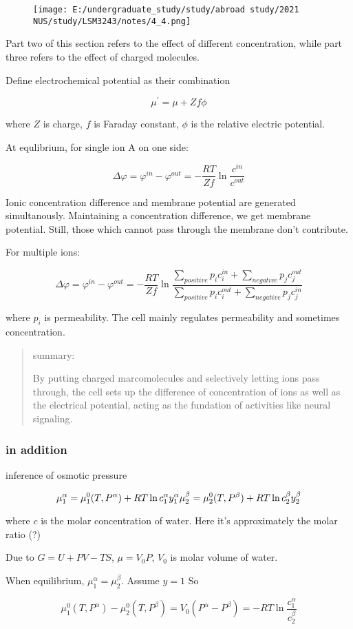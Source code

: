 \begin{figure}
	\centering
	\texttt{[image: E:/undergraduate\_study/study/abroad study/2021 NUS/study/LSM3243/notes/4\_4.png]}
	\caption{}
\end{figure}

Part two of this section refers to the effect of different
concentration, while part three refers to the effect of charged
molecules.

Define electrochemical potential as their combination

\[\mu^\prime=\mu+Zf\phi\]

where \(Z\) is charge, \(f\) is Faraday constant, \(\phi\) is the
relative electric potential.

At equlibrium, for single ion A on one side:

\[\Delta\varphi=\varphi^{in}-\varphi^{out}=-\dfrac{RT}{Zf}\ln\dfrac{c^{in}}{c^{out}}\]

Ionic concentration difference and membrane potential are generated
simultanously. Maintaining a concentration difference, we get membrane
potential. Still, those which cannot pass through the membrane don't
contribute.

For multiple ions:

\[\Delta\varphi=\varphi^{in}-\varphi^{out}=-\dfrac{RT}{Zf}\ln\dfrac{\sum\limits_{positive} p_ic_{i}^{in}+\sum\limits_{negative} p_jc_{j}^{out}}{\sum\limits_{positive} p_ic_{i}^{out}+\sum\limits_{negative} p_jc_{j}^{in}}\]

where \(p_i\) is permeability. The cell mainly regulates permeability
and sometimes concentration.

\begin{quote}
	summary:
	
	By putting charged marcomolecules and selectively letting ions pass
	through, the cell sets up the difference of concentration of ions as
	well as the electrical potential, acting as the fundation of activities
	like neural signaling.
\end{quote}

\hypertarget{in-addition}{%
	\subsubsection{in addition}\label{in-addition}}

inference of osmotic pressure

\[\mu_1^\alpha=\mu_1^0(T,P^\alpha)+RT\ln c_1^\alpha y_1^\alpha\\
\mu_2^\beta=\mu_2^0(T,P^\beta)+RT\ln c_2^\beta y_2^\beta\]

where \(c\) is the molar concentration of water. Here it's approximately
the molar ratio (?)

Due to \(G=U+PV-TS\), \(\mu=V_0P\), \(V_0\) is molar volume of water.

When equilibrium, \(\mu_1^\alpha=\mu_2^\beta\). Assume \(y=1\) So

\[\mu_1^0(T,P^\alpha)-\mu_2^0(T,P^\beta)=V_0(P^\alpha-P^\beta)=-RT\ln\dfrac{c_1^\alpha}{c_2^\beta}\]
